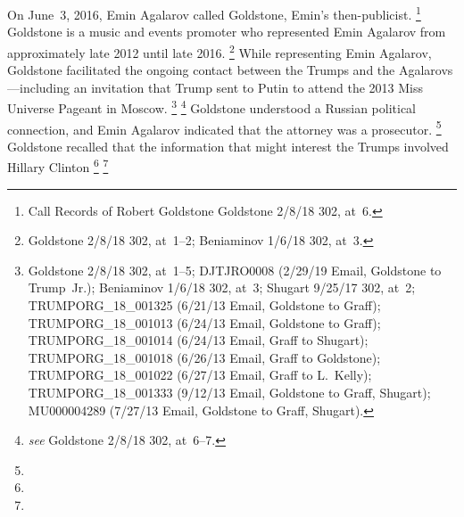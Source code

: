 On June~3, 2016, Emin Agalarov called Goldstone, Emin's then-publicist.%
\footnote{Call Records of Robert Goldstone  Goldstone 2/8/18 302, at~6.}
Goldstone is a music and events promoter who represented Emin Agalarov from approximately late 2012 until late 2016.%
\footnote{Goldstone 2/8/18 302, at~1--2;  Beniaminov 1/6/18 302, at~3.}
While representing Emin Agalarov, Goldstone facilitated the ongoing contact between the Trumps and the Agalarovs---including an invitation that Trump sent to Putin to attend the 2013 Miss Universe Pageant in Moscow.%
\footnote{Goldstone 2/8/18 302, at~1--5; 
DJTJRO0008 (2/29/19 Email, Goldstone to Trump~Jr.);
Beniaminov 1/6/18 302, at~3;
Shugart 9/25/17 302, at~2;
TRUMPORG\_18\_001325 (6/21/13 Email, Goldstone to Graff);
TRUMPORG\_18\_001013 (6/24/13 Email, Goldstone to Graff);
TRUMPORG\_18\_001014 (6/24/13 Email, Graff to Shugart);
TRUMPORG\_18\_001018 (6/26/13 Email, Graff to Goldstone);
TRUMPORG\_18\_001022 (6/27/13 Email, Graff to L.~Kelly);
TRUMPORG\_18\_001333 (9/12/13 Email, Goldstone to Graff, Shugart);
MU000004289 (7/27/13 Email, Goldstone to Graff, Shugart).}
\footnote{ \textit{see} Goldstone 2/8/18 302, at~6--7.}
Goldstone understood
a Russian political connection, and Emin Agalarov indicated that the attorney was a prosecutor.%
\footnote{}
Goldstone recalled that the information that might interest the Trumps involved Hillary Clinton
\footnote{}
\footnote{}

